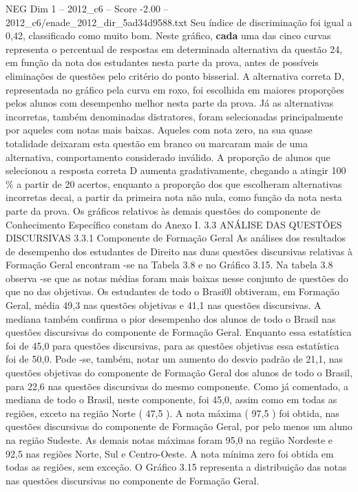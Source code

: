 \begin{textsample}{NEG Dim 1 – 2012\_c6 – Score -2.00 – 2012\_c6/enade\_2012\_dir\_5ad34d9588.txt}
Seu índice de discriminação foi igual a 0,42, classificado como muito bom.
Neste gráfico, \textbf{cada} uma das cinco curvas representa o percentual de respostas em determinada alternativa da questão 24, em função da nota dos estudantes nesta parte da prova, antes de possíveis eliminações de questões pelo critério do ponto bisserial.
A alternativa correta D, representada no gráfico pela curva em roxo, foi escolhida em maiores proporções pelos alunos com desempenho melhor nesta parte da prova.
Já as alternativas incorretas, também denominadas distratores, foram selecionadas principalmente por aqueles com notas mais baixas.
Aqueles com nota zero, na sua quase totalidade deixaram esta questão em branco ou marcaram mais de uma alternativa, comportamento considerado inválido.
A proporção de alunos que selecionou a resposta correta D aumenta gradativamente, chegando a atingir 100 \% a partir de 20 acertos, enquanto a proporção dos que escolheram alternativas incorretas decai, a partir da primeira nota não nula, como função da nota nesta parte da prova.
Os gráficos relativos às demais questões do componente de Conhecimento Específico constam do Anexo I. 3.3 ANÁLISE DAS QUESTÕES DISCURSIVAS 3.3.1 Componente de Formação Geral As análises dos resultados de desempenho dos estudantes de Direito nas duas questões discursivas relativas à Formação Geral encontram -se na Tabela 3.8 e no Gráfico 3.15.
Na tabela 3.8 observa -se que as notas médias foram mais baixas nesse conjunto de questões do que no das objetivas.
Os estudantes de todo o Brasi0l obtiveram, em Formação Geral, média 49,3 nas questões objetivas e 41,1 nas questões discursivas.
A mediana também confirma o pior desempenho dos alunos de todo o Brasil nas questões discursivas do componente de Formação Geral.
Enquanto essa estatística foi de 45,0 para questões discursivas, para as questões objetivas essa estatística foi de 50,0.
Pode -se, também, notar um aumento do desvio padrão de 21,1, nas questões objetivas do componente de Formação Geral dos alunos de todo o Brasil, para 22,6 nas questões discursivas do mesmo componente.
Como já comentado, a mediana de todo o Brasil, neste componente, foi 45,0, assim como em todas as regiões, exceto na região Norte ( 47,5 ).
A nota máxima ( 97,5 ) foi obtida, nas questões discursivas do componente de Formação Geral, por pelo menos um aluno na região Sudeste.
As demais notas máximas foram 95,0 na região Nordeste e 92,5 nas regiões Norte, Sul e Centro-Oeste.
A nota mínima zero foi obtida em todas as regiões, sem exceção.
O Gráfico 3.15 representa a distribuição das notas nas questões discursivas no componente de Formação Geral.

\end{textsample}
